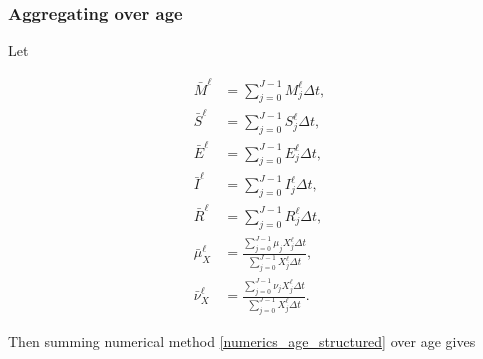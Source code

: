 \documentclass{jpmarticle}
\let\subequationsorig\subequations%
\let\endsubequationsorig\endsubequations%
\renewenvironment{subequations}{
  \subequationsorig
  \renewcommand{\theequation}{\theparentequation.\arabic{equation}}
}{
  \endsubequationsorig
}
\begin{document}
\subsubsection{Aggregating over age}

Let
\begin{subequations}
  \begin{align}
    \bar{M}^{\ell}
    &= \sum_{j = 0}^{J - 1} M_j^{\ell} \Delta t,
    \\
    \bar{S}^{\ell}
    &= \sum_{j = 0}^{J - 1} S_j^{\ell} \Delta t,
    \\
    \bar{E}^{\ell}
    &= \sum_{j = 0}^{J - 1} E_j^{\ell} \Delta t,
    \\
    \bar{I}^{\ell}
    &= \sum_{j = 0}^{J - 1} I_j^{\ell} \Delta t,
    \\
    \bar{R}^{\ell}
    &= \sum_{j = 0}^{J - 1} R_j^{\ell} \Delta t,
    \\
    \bar{\mu}_X^{\ell}
    &= \frac{\sum_{j = 0}^{J - 1} \mu_j X_j^{\ell} \Delta t}
      {\sum_{j = 0}^{J - 1} X_j^{\ell} \Delta t},
    \\
    \bar{\nu}_X^{\ell}
    &= \frac{\sum_{j = 0}^{J - 1} \nu_j X_j^{\ell} \Delta t}
    {\sum_{j = 0}^{J - 1} X_j^{\ell} \Delta t}.
  \end{align}
\end{subequations}
Then summing numerical method
\eqref{numerics_age_structured} over age gives
\end{document}
